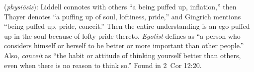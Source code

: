\item[Egotist,]

(\textit{physiōsis}):
Liddell connotes with others ``a being puffed up, inflation,'' then Thayer denotes ``a puffing up of soul, loftiness, pride,'' and Gingrich mentions ``being puffed up, pride, conceit.'' Then the entire understanding is an ego puffed up in the soul because of lofty pride thereto. \emph{Egotist} defines as ``a person who considers himself or herself to be better or more important than other people.'' Also, \emph{conceit} as ``the habit or attitude of thinking yourself better than others, even when there is no reason to think so.''
Found in 2~Cor 12:20.
